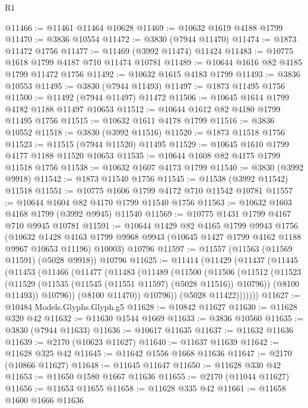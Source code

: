 \begin{lexlean}{R1}
\begin{coremodule}
@11466 := @11461 @11464 @10628
@11469 := @10632 @1619 @4188 @1799
@11470 := @3836 @10554
@11472 := @3830 (@7944 @11470)
@11474 := @1873 @11472 @1756
@11477 := @11469 (@3992 @11474) @11424
@11483 := @10775 @1618 @1799 @4187 @710 @11474 @10781
@11489 := @10644 @1616 @82 @4185 @1799 @11472 @1756
@11492 := @10632 @1615 @4183 @1799
@11493 := @3836 @10553
@11495 := @3830 (@7944 @11493)
@11497 := @1873 @11495 @1756
@11500 := @11492 (@7944 @11497) @11472
@11506 := @10645 @1614 @1799 @4182 @1188 @11497 @10653
@11512 := @10644 @1612 @82 @4180 @1799 @11495 @1756
@11515 := @10632 @1611 @4178 @1799
@11516 := @3836 @10552
@11518 := @3830 (@3992 @11516)
@11520 := @1873 @11518 @1756
@11523 := @11515 (@7944 @11520) @11495
@11529 := @10645 @1610 @1799 @4177 @1188 @11520 @10653
@11535 := @10644 @1608 @82 @4175 @1799 @11518 @1756
@11538 := @10632 @1607 @4173 @1799
@11540 := @3830 (@3992 @9918)
@11542 := @1873 @11540 @1756
@11545 := @11538 (@3992 @11542) @11518
@11551 := @10775 @1606 @1799 @4172 @710 @11542 @10781
@11557 := @10644 @1604 @82 @4170 @1799 @11540 @1756
@11563 := @10632 @1603 @4168 @1799 (@3992 @9945) @11540
@11569 := @10775 @1431 @1799 @4167 @710 @9945 @10781
@11591 := @10644
    @1429
    @82
    @4165
    @1799
    @9943
    @1756
    (@10632
      @1428
      @4163
      @1799
      @9968
      @9943
      (@10645 @1427 @1799 @4162 @1188 @9967 @10653 @11196)
      @10003)
    @10796
@11597 := @11557 (@11563 (@11569 @11591) (@5028 @9918)) @10796
@11625 := @11414
    (@11429
      (@11437
        (@11445
          (@11453
            (@11466
              (@11477
                (@11483
                  (@11489
                    (@11500
                      (@11506
                        (@11512
                          (@11523
                            (@11529 (@11535 (@11545 (@11551 @11597) (@5028 @11516)) @10796))
                            (@8100 @11493))
                          @10796))
                      (@8100 @11470))
                    @10796))
                (@5028 @11422)))))))
@11627 := @10484 Models.Glyphs.Glyph.g5
@11628 := @10842 @11627
@11630 := @11628 @320 @42
@11632 := @11630 @1544 @1669
@11633 := @3836 @10560
@11635 := @3830 (@7944 @11633)
@11636 := @10617 @11635
@11637 := @11632 @11636
@11639 := @2170 (@10623 @11627)
@11640 := @11637 @11639
@11642 := @11628 @325 @42
@11645 := @11642 @1556 @1668 @11636
@11647 := @2170 (@10866 @11627)
@11648 := @11645 @11647
@11650 := @11628 @330 @42
@11653 := @11650 @1580 @1667 @11636
@11655 := @2170 (@11044 @11627)
@11656 := @11653 @11655
@11658 := @11628 @335 @42
@11661 := @11658 @1600 @1666 @11636

\end{coremodule}
\end{lexlean}
